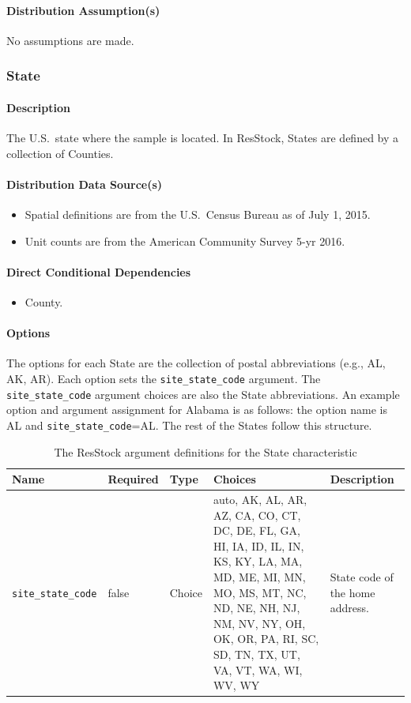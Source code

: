 \paragraph{Distribution Assumption(s)}
No assumptions are made.

\subsubsection{State}
\paragraph{Description}
The U.S.~state where the sample is located. In ResStock, States are defined by a collection of Counties.

\paragraph{Distribution Data Source(s)}
\begin{itemize} 
\item
  Spatial definitions are from the U.S.~Census Bureau as of July 1,
  2015.
\item
  Unit counts are from the American Community Survey 5-yr 2016.
\end{itemize}

\paragraph{Direct Conditional Dependencies}
\begin{itemize} 
\item County.
\end{itemize}

\paragraph{Options}
The options for each State are the collection of postal abbreviations (e.g., AL, AK, AR). Each option sets the \texttt{site\_state\_code} argument. The \texttt{site\_state\_code} argument choices are also the State abbreviations. An example option and argument assignment for Alabama is as follows: the option name is AL and \texttt{site\_state\_code}=AL. The rest of the States follow this structure.

\begin{longtable}[]{ |p{3.5cm}|p{1.5cm}|p{1cm}|p{4.5cm}|p{3cm}| }
\caption{The ResStock argument definitions for the State characteristic} \label{table:hc_arg_def_state}  \\
\toprule\noalign{}
Name & Required & Type & Choices & Description \\
\midrule\noalign{}
\endhead
\bottomrule\noalign{}
\endlastfoot
\texttt{site\_state\_code} & false  & Choice & auto, AK, AL, AR, AZ,
CA, CO, CT, DC, DE, FL, GA, HI, IA, ID, IL, IN, KS, KY, LA, MA, MD, ME,
MI, MN, MO, MS, MT, NC, ND, NE, NH, NJ, NM, NV, NY, OH, OK, OR, PA, RI,
SC, SD, TN, TX, UT, VA, VT, WA, WI, WV, WY & State code of the home
address. \\
\end{longtable}

